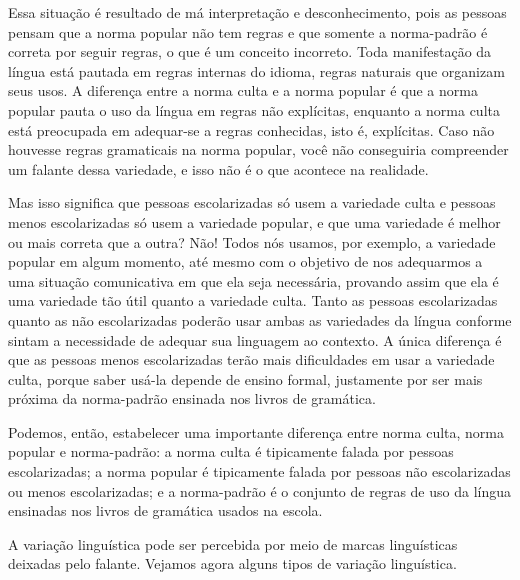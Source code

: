 Essa situação é resultado de má interpretação e desconhecimento, pois as
pessoas pensam que a norma popular não tem regras e que somente a
norma-padrão é correta por seguir regras, o que é um conceito incorreto.
Toda manifestação da língua está pautada em regras internas do idioma,
regras naturais que organizam seus usos. A diferença entre a norma culta
e a norma popular é que a norma popular pauta o uso da língua em regras
não explícitas, enquanto a norma culta está preocupada em adequar-se a
regras conhecidas, isto é, explícitas. Caso não houvesse regras
gramaticais na norma popular, você não conseguiria compreender um
falante dessa variedade, e isso não é o que acontece na realidade.

Mas isso significa que pessoas escolarizadas só usem a variedade culta e
pessoas menos escolarizadas só usem a variedade popular, e que uma
variedade é melhor ou mais correta que a outra? Não! Todos nós usamos,
por exemplo, a variedade popular em algum momento, até mesmo com o
objetivo de nos adequarmos a uma situação comunicativa em que ela seja
necessária, provando assim que ela é uma variedade tão útil quanto a
variedade culta. Tanto as pessoas escolarizadas quanto as não
escolarizadas poderão usar ambas as variedades da língua conforme sintam
a necessidade de adequar sua linguagem ao contexto. A única diferença é
que as pessoas menos escolarizadas terão mais dificuldades em usar a
variedade culta, porque saber usá-la depende de ensino formal,
justamente por ser mais próxima da norma-padrão ensinada nos livros de
gramática.

Podemos, então, estabelecer uma importante diferença entre norma culta,
norma popular e norma-padrão: a norma culta é tipicamente falada por
pessoas escolarizadas; a norma popular é tipicamente falada por pessoas
não escolarizadas ou menos escolarizadas; e a norma-padrão é o conjunto
de regras de uso da língua ensinadas nos livros de gramática usados na
escola.

A variação linguística pode ser percebida por meio de marcas
linguísticas deixadas pelo falante. Vejamos agora alguns tipos de
variação linguística.

